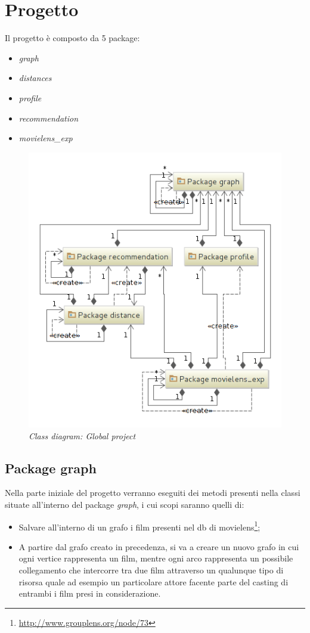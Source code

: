 \section{Progetto}
\label{project}

Il progetto è composto da 5 package:
\begin{itemize}
\item\emph{graph}
\item\emph{distances}
\item\emph{profile}
\item\emph{recommendation}
\item\emph{movielens\_exp}
\end{itemize}

\begin{figure}[H]
	\includegraphics[width=.8\textwidth]{./images/Diagrams/global.png}
	\caption{\emph{Class diagram: Global project}}
\end{figure}

\subsection{Package graph}
Nella parte iniziale del progetto verranno eseguiti dei metodi presenti nella classi situate all'interno del package \emph{graph}, i cui scopi saranno quelli di:
\begin{itemize}
\item Salvare all'interno di un grafo i film presenti nel db di movielens\footnote{\url{http://www.grouplens.org/node/73}};
\item A partire dal grafo creato in precedenza, si va a creare un nuovo grafo in cui ogni vertice rappresenta un film, mentre ogni arco rappresenta un possibile collegamento che intercorre tra due film attraverso un qualunque tipo di risorsa quale ad esempio un particolare attore facente parte del casting di entrambi i film presi in considerazione.
\end{itemize}
